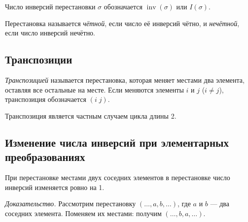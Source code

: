 \documentclass[a4paper,12pt]{article}
\theoremstyle{definition}
\theoremstyle{plain}
\theoremstyle{remark}
\begin{document}
	Число инверсий перестановки \( \sigma \) обозначается \( \operatorname{inv}(\sigma) \) или \( I(\sigma) \).
	
	\begin{tcolorbox}[colback=yellow!5, colframe=orange!50!black, title=Определение чётности]
		Перестановка называется \textit{чётной}, если число её инверсий чётно, и \textit{нечётной}, если число инверсий нечётно.
	\end{tcolorbox}
	
	\subsection{Транспозиции}
	
	\begin{tcolorbox}[colback=blue!5, colframe=blue!40!black, title=Определение]
		\textit{Транспозицией} называется перестановка, которая меняет местами два элемента, оставляя все остальные на месте. Если меняются элементы \( i \) и \( j \) (\( i \neq j \)), транспозиция обозначается \( (i \; j) \).
	\end{tcolorbox}
	
	Транспозиция является частным случаем цикла длины 2.
	
	\subsection{Изменение числа инверсий при элементарных преобразованиях}
	
	\begin{tcolorbox}[colback=red!5, colframe=red!50!black, title=Лемма 1 (Транспозиция соседних элементов)]
		При перестановке местами двух соседних элементов в перестановке число инверсий изменяется ровно на 1.
	\end{tcolorbox}
	
	\medskip
	\textit{Доказательство.}
	Рассмотрим перестановку \( (\dots, a, b, \dots) \), где \( a \) и \( b \) — два соседних элемента. Поменяем их местами: получим \( (\dots, b, a, \dots) \).
	
\end{document}
